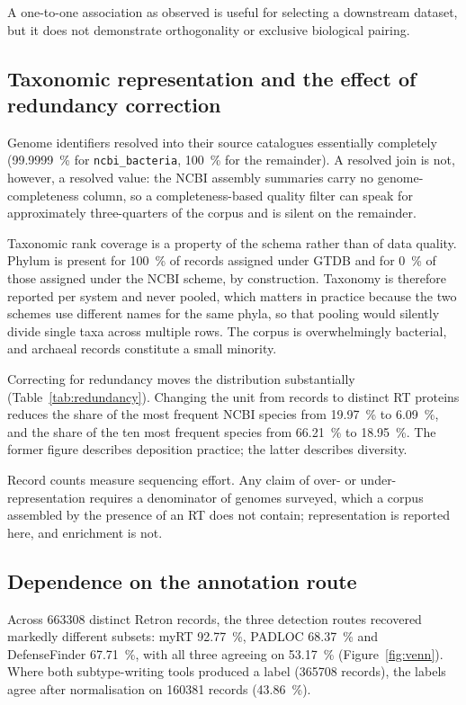 A one-to-one association as observed is useful for selecting a downstream dataset, but it does not
demonstrate orthogonality or exclusive biological pairing.

\subsection{Taxonomic representation and the effect of redundancy correction}
\label{sec:dbchar:taxonomy}

Genome identifiers resolved into their source catalogues essentially completely
(\SI{99.9999}{\percent} for \texttt{ncbi\_bacteria}, \SI{100}{\percent} for the remainder). A
resolved join is not, however, a resolved value: the NCBI assembly summaries carry no
genome-completeness column, so a completeness-based quality filter can speak for approximately
three-quarters of the corpus and is silent on the remainder.

Taxonomic rank coverage is a property of the schema rather than of data quality. Phylum is present
for \SI{100}{\percent} of records assigned under GTDB and for \SI{0}{\percent} of those assigned
under the NCBI scheme, by construction. Taxonomy is therefore reported per system and never pooled,
which matters in practice because the two schemes use different names for the same phyla, so that
pooling would silently divide single taxa across multiple rows. The corpus is overwhelmingly
bacterial, and archaeal records constitute a small minority.

Correcting for redundancy moves the distribution substantially (Table~\ref{tab:redundancy}).
Changing the unit from records to distinct RT proteins reduces the share of the most frequent NCBI
species from \SI{19.97}{\percent} to \SI{6.09}{\percent}, and the share of the ten most frequent
species from \SI{66.21}{\percent} to \SI{18.95}{\percent}. The former figure describes deposition
practice; the latter describes diversity.

Record counts measure sequencing effort. Any claim of over- or under-representation requires a
denominator of genomes surveyed, which a corpus assembled by the presence of an RT does not contain;
representation is reported here, and enrichment is not.

\subsection{Dependence on the annotation route}
\label{sec:dbchar:tools}

Across \num{663308} distinct Retron records, the three detection routes recovered markedly different
subsets: myRT \SI{92.77}{\percent}, PADLOC \SI{68.37}{\percent} and DefenseFinder
\SI{67.71}{\percent}, with all three agreeing on \SI{53.17}{\percent} (Figure~\ref{fig:venn}). Where
both subtype-writing tools produced a label (\num{365708} records), the labels agree after
normalisation on \num{160381} records (\SI{43.86}{\percent}).

